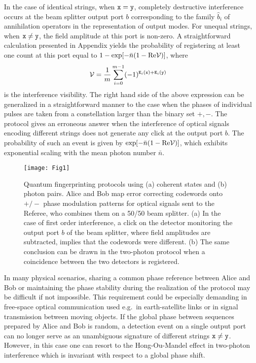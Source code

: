 \documentclass[10pt]{article}
\begin{document}
In the case of identical strings, when ${\tt x} = {\tt y}$, completely destructive interference occurs at the beam splitter output port $b$ corresponding to the family $\hat{b}_i$ of annihilation operators in the representation of output modes. For unequal strings, when ${\tt x} \neq {\tt y}$, the field amplitude at this port is non-zero. A straightforward calculation presented in Appendix yields the probability of registering at least one count at this port equal to $1-\exp[-\bar{n}(1-\text{Re} {\cal V})]$, where
\begin{equation}
{\cal V} = \frac{1}{m} \sum_{i=0}^{m-1} (-1)^{{\tt E}_i({\tt x}) + {\tt E}_i({\tt y})}
\label{Eq:VisibilityDef}
\end{equation}
is the interference visibility. The right hand side of the above expression can be generalized in a straightforward manner to the case when the phases of individual pulses are taken from a constellation larger than the binary set $+,-$. The protocol gives an erroneous answer when the interference of optical signals encoding different strings does not generate any click at the output port $b$.
The  probability of such an event is given by $ \exp[-\bar{n}(1-\text{Re} {\cal V})] $, which exhibits exponential scaling with the mean photon number $\bar{n}$.
\begin{figure}
\texttt{[image: Fig1]}\centering\caption{Quantum fingerprinting protocols using (a) coherent states and (b) photon pairs. Alice and Bob map error correcting codewords onto
$+/-$ phase modulation patterns for optical signals sent to the Referee, who combines them on a 50/50 beam splitter. (a) In the case of first order interference, a click on the detector monitoring the output port $b$ of the beam splitter, where field amplitudes are subtracted, implies that the codewords were different. (b) The same conclusion can be drawn in the two-photon protocol when a coincidence between the two detectors is registered.}
\label{fig:Scheme}
\end{figure}
In many physical scenarios, sharing a common phase reference between Alice and Bob or maintaining the phase stability during the realization of the protocol may be difficult if not impossible. This requirement could be especially demanding in free-space optical communication used e.g.\ in earth-satellite links or in signal transmission between moving objects. If the global phase between sequences prepared by Alice and Bob is random, a detection event on a single output port can no longer serve as an unambiguous signature of different strings ${\tt x} \neq {\tt y}$. However, in this case one can resort to the Hong-Ou-Mandel effect \cite{HOMI} in two-photon interference which is invariant with respect to a global phase shift.
\end{document}
